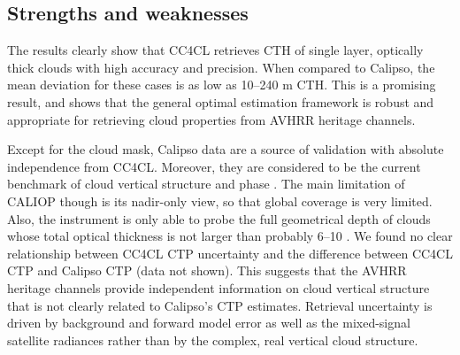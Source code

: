 \subsection{Strengths and weaknesses}

The results clearly show that CC4CL retrieves CTH of single layer, optically thick clouds with high accuracy and precision. When compared to Calipso, the mean deviation for these cases is as low as 10--240 m CTH. This is a promising result, and shows that the general optimal estimation framework is robust and appropriate for retrieving cloud properties from AVHRR heritage channels. 

Except for the cloud mask, Calipso data are a source of validation with absolute independence from CC4CL. Moreover, they are considered to be the current benchmark of cloud vertical structure and phase \citep{Winker09}. The main limitation of CALIOP though is its nadir-only view, so that global coverage is very limited. Also, the instrument is only able to probe the full geometrical depth of clouds whose total optical thickness is not larger than probably 6--10 \citep{Karlsson10}. We found no clear relationship between CC4CL CTP uncertainty and the difference between CC4CL CTP and Calipso CTP (data not shown). This suggests that the AVHRR heritage channels provide independent information on cloud vertical structure that is not clearly related to Calipso's CTP estimates. Retrieval uncertainty is driven by background and forward model error as well as the mixed-signal satellite radiances rather than by the complex, real vertical cloud structure.

